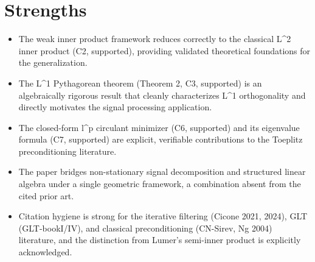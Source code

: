 \documentclass[11pt]{article}
\begin{document}
\section*{Strengths}
\begin{itemize}[leftmargin=*]
  \item The weak inner product framework reduces correctly to the classical L\^{}2 inner product (C2, supported), providing validated theoretical foundations for the generalization.
  \item The L\^{}1 Pythagorean theorem (Theorem 2, C3, supported) is an algebraically rigorous result that cleanly characterizes L\^{}1 orthogonality and directly motivates the signal processing application.
  \item The closed-form l\^{}p circulant minimizer (C6, supported) and its eigenvalue formula (C7, supported) are explicit, verifiable contributions to the Toeplitz preconditioning literature.
  \item The paper bridges non-stationary signal decomposition and structured linear algebra under a single geometric framework, a combination absent from the cited prior art.
  \item Citation hygiene is strong for the iterative filtering (Cicone 2021, 2024), GLT (GLT-bookI/IV), and classical preconditioning (CN-Sirev, Ng 2004) literature, and the distinction from Lumer's semi-inner product is explicitly acknowledged.
\end{itemize}
\end{document}
